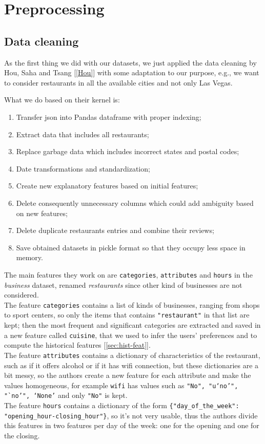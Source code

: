 
\section{Preprocessing} \label{sec:preprocessing}

\subsection{Data cleaning} \label{sec:data-clean}

As the first thing we did with our datasets, we just applied the data cleaning by Hou, Saha and Tsang [\ref{Hou}] with some adaptation to our purpose, e.g., we want to consider restaurants in all the available cities and not only Las Vegas.

What we do based on their kernel is:
\begin{enumerate}
	\item Transfer json into Pandas dataframe with proper indexing;
	\item Extract data that includes all restaurants;
	\item Replace garbage data which includes incorrect states and postal codes;
	\item Date transformations and standardization;
	\item Create new explanatory features based on initial features;
	\item Delete consequently unnecessary columns which could add ambiguity based on new features;
	\item Delete duplicate restaurants entries and combine their reviews;
	\item Save obtained datasets in pickle format so that they occupy less space in memory.
\end{enumerate}

The main features they work on are \texttt{categories}, \texttt{attributes} and \texttt{hours} in the \textit{business} dataset, renamed \textit{restaurants} since other kind of businesses are not considered.\\
The feature \texttt{categories} contains a list of kinds of businesses, ranging from shops to sport centers, so only the items that contains \texttt{"restaurant"} in that list are kept; then the most frequent and significant categories are extracted and saved in a new feature called \texttt{cuisine}, that we used to infer the users' preferences and to compute the historical features [\ref{sec:hist-feat}].\\
The feature \texttt{attributes} contains a dictionary of characteristics of the restaurant, such as if it offers alcohol or if it has wifi connection, but these dictionaries are a bit messy, so the authors create a new feature for each attribute and make the values homogeneous, for example \texttt{wifi} has values such as \texttt{"No", "u`no'", "`no'", `None'} and only \texttt{"No"} is kept.\\
The feature \texttt{hours} contains a dictionary of the form \texttt{\{"day\_of\_the\_week": "opening\_hour-closing\_hour"\}}, so it's not very usable, thus the authors divide this features in two features per day of the week: one for the opening and one for the closing.


